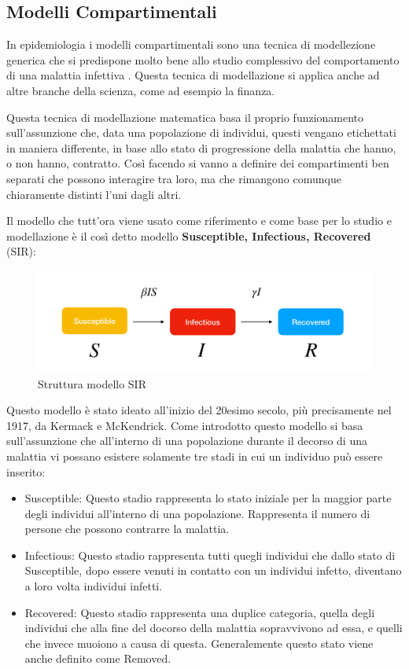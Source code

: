 \subsection{Modelli Compartimentali}
In epidemiologia i modelli compartimentali sono una tecnica di modellezione 
generica che si predispone molto bene allo studio complessivo del comportamento
di una malattia infettiva \cite{wiki:Compartmental_models_in_epidemiology}. 
Questa tecnica di modellazione si applica anche ad altre branche della 
scienza, come ad esempio la finanza.

Questa tecnica di modellazione matematica basa il proprio funzionamento 
sull'assunzione che, data una popolazione di individui, questi vengano 
etichettati in maniera differente, in base allo stato di progressione 
della malattia che hanno, o non hanno, contratto. Così facendo si vanno a 
definire dei compartimenti ben separati che possono interagire tra loro, ma 
che rimangono comunque chiaramente distinti l'uni dagli altri.

Il modello che tutt'ora viene usato come riferimento e come base per 
lo studio e modellazione è il così detto modello 
\textbf{Susceptible, Infectious, Recovered} (SIR):

\begin{figure}[h]
    \includegraphics[width=\linewidth]{img/sir.png}
    \caption{Struttura modello SIR} 
    \label{fig:SIR_Structure}
\end{figure}

Questo modello è stato ideato all'inizio del 20esimo secolo, 
più precisamente nel 1917, da Kermack e McKendrick. Come introdotto questo modello
si basa sull'assunzione che all'interno di una popolazione durante 
il decorso di una malattia vi possano esistere solamente tre stadi in cui 
un individuo può essere inserito: 

\begin{itemize}
    \item Susceptible: Questo stadio rappresenta lo stato iniziale per la maggior parte
    degli individui all'interno di una popolazione. Rappresenta il numero di 
    persone che possono contrarre la malattia.
    \item Infectious: Questo stadio rappresenta tutti quegli individui che dallo 
    stato di Susceptible, dopo essere venuti in contatto con un individui infetto, 
    diventano a loro volta individui infetti.
    \item Recovered: Questo stadio rappresenta una duplice categoria, quella degli
    individui che alla fine del docorso della malattia sopravvivono ad essa, e 
    quelli che invece muoiono a causa di questa. Generalemente questo stato viene
    anche definito come Removed.
\end{itemize}

